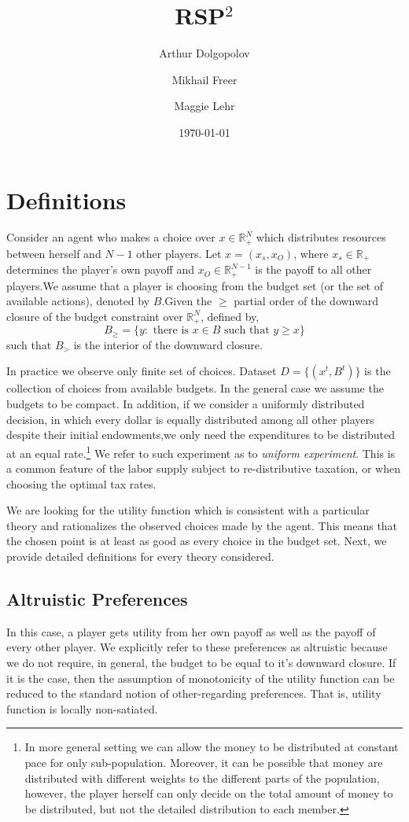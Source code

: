 \documentclass[12pt,dvipsnames]{amsart}
\title{RSP$^2$}
\author[A. Dolgopolov]{Arthur Dolgopolov}
\author[M. Freer]{Mikhail Freer}
\author[M. Lehr]{Maggie Lehr}
\date{\today}
\newcommand{\R}{\mathbb{R}}
\begin{document}
\maketitle

\section{Definitions}
Consider an agent who makes a choice over $x\in \R^N_+$ which distributes resources between herself and $N-1$ other players. Let
$x = (x_s,x_O)$, where $x_s\in {\mathbb{R}}_+$ determines the player’s own payoff and $x_O \in {\mathbb{R}}^{N-1}_+$ is the payoff to all other players.We assume that a player is choosing from the budget set (or the set of available actions), denoted by $B$.Given the $\geq$ partial order of the 
downward closure of the budget constraint over ${\mathbb{R}}^N_+$, defined by,
$$
B_{\geq} = \{y: \text{ there is } x\in B \text{ such that } y \geq x\}
$$
such that $B_{>}$ is the interior of the downward closure.

In practice we observe only finite set of choices. Dataset
$D=\{(x^t,B^t)\}$ is the collection of choices from available budgets. In the
general case we assume the budgets to be compact. In addition, if
we consider a uniformly distributed decision, in which every dollar is equally distributed among all other players despite their initial endowments,we only need the expenditures to be distributed at an equal rate.\footnote{
	In more general setting we can allow the money to be distributed at constant pace for only sub-population.
	Moreover, it can be possible that money are distributed with different weights to the different parts of the population, however, the player herself can only decide on the total amount of money to be distributed, but not the detailed distribution to each member.
}
We refer to such experiment as to \emph{uniform experiment}.
This is a common feature of the labor supply
subject to re-distributive taxation, or when choosing the optimal tax rates.

We are looking for the utility function which is consistent 
with a particular theory and rationalizes the observed choices made by the agent. This means that the chosen point is at least as good as every choice in the budget set. Next, we
provide detailed definitions for every theory considered.



\subsection{Altruistic Preferences}
In this case, a player gets utility from her own payoff as well as the payoff of every other player. We explicitly refer to these preferences as altruistic because we do not require, in general, the budget to be equal to it’s downward closure. If it is the case, then the assumption of monotonicity of the utility function can be reduced to the standard
notion of other-regarding preferences. That is, utility function is locally non-satiated.
\end{document}
